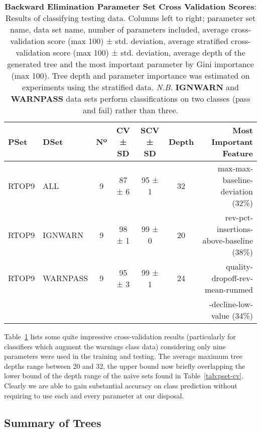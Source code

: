 \begin{table}[H]
    \centering
    \begin{tabular}{l l | c  c  c  c  r}
        PSet & DSet          & Nº & CV ± SD & SCV ± SD & Depth & Most Important Feature\\
        \hline
        RTOP9 & ALL         & 9  & 87 ± 6  & 95 ± 1 & 32 & max-max-baseline-deviation (32\%)\\
        RTOP9 & IGNWARN     & 9  & 98 ± 1  & 99 ± 0 & 20 & rev-pct-insertions-above-baseline (38\%)\\
        RTOP9 & WARNPASS    & 9 & 95 ± 3 & 99 ± 1 & 24 &
                                                    quality-dropoff-rev-mean-runmed\\
                                                    &&&&&&-decline-low-value (34\%)\\
    \end{tabular}

    \caption[be-pset-cv]{\textbf{Backward Elimination Parameter Set Cross Validation Scores}:
        Results of classifying testing data.
        Columns left to right; parameter set name, data set name, number of parameters
        included, average cross-validation score (max 100) ± std. deviation,
        average stratified cross-validation score (max 100) ± std. deviation,
        average depth of the generated tree and the most important parameter by
        Gini importance (max 100). Tree depth and parameter importance was
        estimated on experiments using the stratified data. \textit{N.B.}
        \textbf{IGNWARN} and \textbf{WARNPASS} data sets perform classifications on
        two classes (pass and fail) rather than three.}
    \label{tab:be-pset-cv}
\end{table}

Table~\ref{tab:be-pset-cv} lists some quite impressive cross-validation results
(particularly for classifiers which augment the warnings class data) considering
only nine parameters were used in the training and testing.  The average maximum
tree depths range between 20 and 32, the upper bound now briefly overlapping the
lower bound of the depth range of the naive sets found in
Table~\ref{tab:pset-cv}. Clearly we are able to gain substantial accuracy on
class prediction without requiring to use each and every parameter at our
disposal.


\subsection{Summary of Trees}

